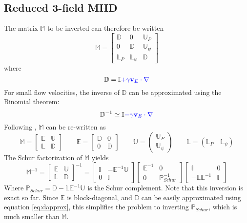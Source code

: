 \documentclass[12pt]{article}
\newcommand{\Vec}[1]{\ensuremath{\mathbf{#1}}}
\newcommand{\vvec}{\Vec{v}}
\begin{document}
\subsection{Reduced 3-field MHD}
The matrix $\mathbb{M}$ to be inverted can therefore be written
\begin{equation}
\mathbb{M} = 
\left[ \begin{array}{ccc}
\mathbb{D} & 0 & \mathbb{U}_P \\
0 & \mathbb{D} & \mathbb{U}_\psi \\
\mathbb{L}_P & \mathbb{L}_\psi & \mathbb{D}
\end{array}\right]
\end{equation}
where
\[
\mathbb{D} = \mathbb{I} \color{blue}{+ \gamma\vvec_E\cdot\nabla}
\]
For small flow velocities, the inverse of $\mathbb{D}$ can be approximated using the Binomial theorem:
\begin{equation}
\mathbb{D}^{-1} \simeq \mathbb{I} \color{blue}{- \gamma\vvec_E\cdot\nabla}
\label{eq:dapprox}
\end{equation}
Following \cite{chacon-2008, chacon-2002}, $\mathbb{M}$ can be re-written as
\[
\mathbb{M} = 
\left[ \begin{array}{cc}
\mathbb{E} & \mathbb{U} \\
\mathbb{L} & \mathbb{D}
\end{array}\right] \qquad \mathbb{E} = 
\left[ \begin{array}{cc}
\mathbb{D} & 0 \\
0 & \mathbb{D}
\end{array}\right] \qquad \mathbb{U} =
\left(\begin{array}{c}
\mathbb{U}_P \\
\mathbb{U}_\psi
\end{array}\right) \qquad \mathbb{L} = \left(\mathbb{L}_P \quad \mathbb{L}_\psi\right)
\]
The Schur factorization of $\mathbb{M}$ yields \cite{chacon-2008}
\[
\mathbb{M}^{-1} = 
\left[ \begin{array}{cc}
\mathbb{E} & \mathbb{U} \\
\mathbb{L} & \mathbb{D}
\end{array}\right]^{-1} = 
\left[ \begin{array}{cc}
\mathbb{I} & -\mathbb{E}^{-1}\mathbb{U} \\
0 & \mathbb{I}
\end{array}\right]
\left[ \begin{array}{cc}
\mathbb{E}^{-1} & 0 \\
0 & \mathbb{P}_{Schur}^{-1}
\end{array}\right]
\left[ \begin{array}{cc}
\mathbb{I} & 0 \\
-\mathbb{L}\mathbb{E}^{-1} & \mathbb{I}
\end{array}\right]
\]
Where $\mathbb{P}_{Schur} = \mathbb{D} - \mathbb{L}\mathbb{E}^{-1}\mathbb{U}$ is the Schur complement. Note that
this inversion is exact so far.
Since $\mathbb{E}$ is block-diagonal, and $\mathbb{D}$ can be easily approximated using equation \ref{eq:dapprox},
this simplifies the problem to inverting $\mathbb{P}_{Schur}$, which is much smaller than $\mathbb{M}$.
\end{document}

